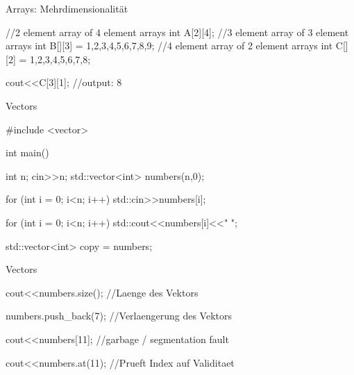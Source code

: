\ifnum\conditionmacro=1 \documentclass[handout,usenames,dvipsnames]{beamer}\fi
\begin{document}

\begin{frame}[fragile]{Arrays: Mehrdimensionalität}
\begin{TPCpp}
//2 element array of 4 element arrays
int A[2][4];
//3 element array of 3 element arrays
int B[][3] = {{1,2,3},{4,5,6},{7,8,9}};
//4 element array of 2 element arrays
int C[][2] = {1,2,3,4,5,6,7,8};

cout<<C[3][1]; //output: 8
\end{TPCpp}
\end{frame}


\begin{frame}[fragile]{Vectors}
\begin{TFCpp}
#include <vector>

int main(){
	int n; 
	cin>>n;
	std::vector<int> numbers(n,0);

	for (int i = 0; i<n; i++)
		std::cin>>numbers[i];
	
	for (int i = 0; i<n; i++)
		std::cout<<numbers[i]<<" ";
		
	std::vector<int> copy = numbers;

}
\end{TFCpp}
\end{frame}


\begin{frame}[fragile]{Vectors}
\begin{TFCpp}
cout<<numbers.size(); //Laenge des Vektors

numbers.push_back(7); //Verlaengerung des Vektors

cout<<numbers[11]; //garbage / segmentation fault

cout<<numbers.at(11); //Prueft Index auf Validitaet


\end{TFCpp}

\end{frame}
\end{document}
